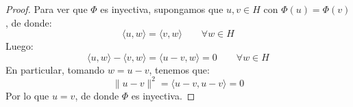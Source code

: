 \begin{prop}
\begin{proof}
        \noindent
        Para ver que $\Phi$ es inyectiva, supongamos que $u,v\in H$ con $\Phi(u) = \Phi(v)$, de donde:
        \begin{equation*}
            \langle u,w \rangle  = \langle v,w \rangle  \qquad \forall w\in H
        \end{equation*}
        Luego:
        \begin{equation*}
            \langle u,w \rangle  - \langle v,w \rangle  = \langle u-v,w \rangle  = 0 \qquad \forall w\in H
        \end{equation*}
        En particular, tomando $w= u-v$, tenemos que:
        \begin{equation*}
            \|u-v\|^2 = \langle u-v,u-v \rangle  = 0
        \end{equation*}
        Por lo que $u=v$, de donde $\Phi$ es inyectiva.
    \end{proof}
\end{prop}


